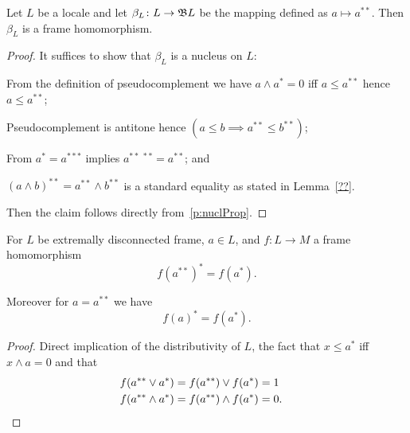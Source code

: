 \begin{lemma}
    Let $L$ be a locale and let $\beta_L\colon L \to \mathfrak{B} L$ be the mapping defined as $a \mapsto a^{**}$. Then $\beta_L$ is a frame homomorphism.
\end{lemma}
\begin{proof}
    It suffices to show that $\beta_L$ is a nucleus on $L$:
    \begin{enumerate*}[label=(N\arabic*),itemjoin=~]
        \item From the definition of pseudocomplement we have $a \wedge a^* = 0$ iff $a \leq a^{**}$ hence $a \leq a^{**}$;
        \item Pseudocomplement is antitone hence $(a \leq b \implies a^{**} \leq b^{**})$;
        \item From $a^* = a^{***}$ implies $a^{**\;**} = a^{**}$; and
        \item $(a \wedge b)^{**} = a^{**} \wedge b^{**}$ is a standard equality as stated in Lemma~\ref{??}.
    \end{enumerate*}

    Then the claim follows directly from~\ref{p:nuclProp}. %
\end{proof}

\begin{lemma}
    For $L$ be extremally disconnected frame, $a \in L$, and $f\colon L \to M$ a frame homomorphism
    $$ f(a^{**})^* = f(a^*).$$

    Moreover for $a = a^{**}$ we have
    $$ f(a)^* = f(a^*).$$
\end{lemma}
\begin{proof}
    Direct implication of the distributivity of $L$, the fact that $x \leq a^* $ iff $x \wedge a = 0$ and that
    \begin{align*}
        f(a^{**} \vee a^*) & = f(a^{**}) \vee f(a^*) = 1 \\
        f(a^{**} \wedge a^*) & = f(a^{**}) \wedge f(a^*) = 0. &\qedhere
    \end{align*}
\end{proof}

